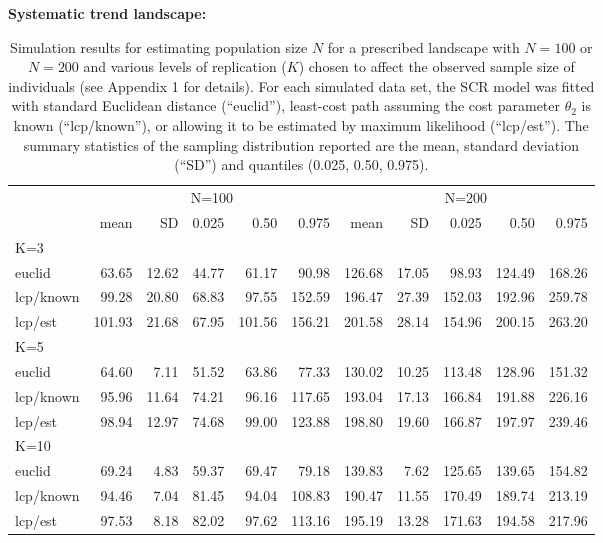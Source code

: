 \documentclass[12pt]{article}
\begin{document}
\begin{table}[h!]
{\small
\caption{Simulation results for estimating population size $N$ for a
  prescribed landscape with
$N=100$ or $N=200$ and various levels of replication ($K$) chosen to affect the observed sample
size of individuals (see Appendix 1 for details). For each simulated data set, the SCR model was fitted with
standard Euclidean distance (``euclid''), least-cost path assuming the
cost parameter $\theta_2$ is known (``lcp/known''), or allowing it to
be estimated by maximum likelihood (``lcp/est'').
The summary statistics of the
sampling distribution reported are the mean, standard deviation
(``SD'') and quantiles (0.025, 0.50, 0.975).
}
{\bf Systematic trend landscape:} \\
\begin{tabular}{l|rrrrr|rrrrr}
         & \multicolumn{5}{c}{N=100   } & \multicolumn{5}{c}{N=200  }  \\
         &   mean &  SD  & 0.025 & 0.50 & 0.975  & mean  & SD   & 0.025 & 0.50  & 0.975 \\ \hline
K=3      &        &      &       &      &        &       &      &       &       &       \\
euclid   &   63.65& 12.62& 44.77 & 61.17&  90.98 & 126.68& 17.05&  98.93& 124.49& 168.26 \\
lcp/known&   99.28& 20.80& 68.83 & 97.55& 152.59 & 196.47& 27.39& 152.03& 192.96& 259.78\\
lcp/est  &  101.93& 21.68& 67.95 &101.56& 156.21 & 201.58& 28.14& 154.96& 200.15& 263.20\\
K=5      &        &      &       &      &        &       &      &       &       &        \\
euclid   &  64.60 & 7.11 & 51.52 & 63.86&  77.33 & 130.02& 10.25& 113.48& 128.96& 151.32\\
lcp/known&  95.96 &11.64 & 74.21 & 96.16& 117.65 & 193.04& 17.13& 166.84& 191.88& 226.16\\
lcp/est  &  98.94 &12.97 & 74.68 & 99.00& 123.88 & 198.80& 19.60& 166.87& 197.97& 239.46\\
K=10     &        &      &       &      &        &       &      &       &       &       \\
euclid   &  69.24 & 4.83 & 59.37 & 69.47&  79.18 & 139.83&  7.62& 125.65& 139.65& 154.82\\
lcp/known&  94.46 & 7.04 & 81.45 & 94.04& 108.83 & 190.47& 11.55& 170.49& 189.74& 213.19\\
lcp/est  &  97.53 & 8.18 & 82.02 & 97.62& 113.16 & 195.19& 13.28& 171.63& 194.58& 217.96\\ \hline

\end{tabular}}
\end{table}
\end{document}
